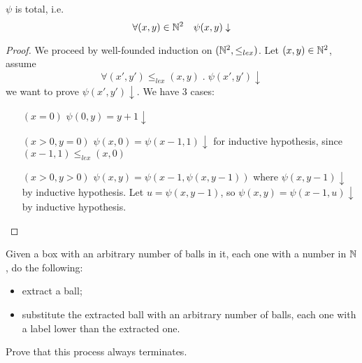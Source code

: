 \newcommand{\nsqlex}{\( (\nat ^2, \leq_{lex})\)}

\begin{theorem}
  $\psi$ is total, i.e.
  \[\forall (x,y) \in \mathbb{N}^2 \quad \psi (x,y) \downarrow \]
  \begin{proof}
    We proceed by well-founded induction on \nsqlex.
    Let $(x,y) \in \mathbb{N}^2$, assume 
    \[
    \forall (x', y')\leq_{lex} (x,y) \;.\; \psi(x',y')\downarrow
    \]    
    we want to prove $\psi(x',y')\downarrow$.
    We have 3 cases:
    \begin{enumerate}
      \item[$(x=0)$] \(\psi(0,y) = y + 1 \downarrow\)
      \item[$(x>0,y=0)$] $\psi(x,0) = \psi(x-1,1) \downarrow $ for
          inductive hypothesis, since $(x-1,1) \leq_{lex} (x,0)$
      \item[$(x>0,y>0)$] $\psi(x,y) = \psi(x-1,\psi(x,y-1))$
          where $\psi(x,y-1) \downarrow$ by inductive hypothesis. Let
           $u = \psi(x,y-1)$, so
          $\psi(x,y) = \psi(x-1,u) \downarrow $ by inductive
          hypothesis.
      \end{enumerate}
  \end{proof}
\end{theorem}

\begin{exercise}
  Given a box with an arbitrary number of balls in it, each one with a
  number in $\mathbb{N}$, do the following:
  \begin{itemize}
  \item extract a ball;
  \item substitute the extracted ball with an arbitrary number of
    balls, each one with a label lower than the extracted one.
  \end{itemize}
  Prove that this process always terminates.
\end{exercise}


